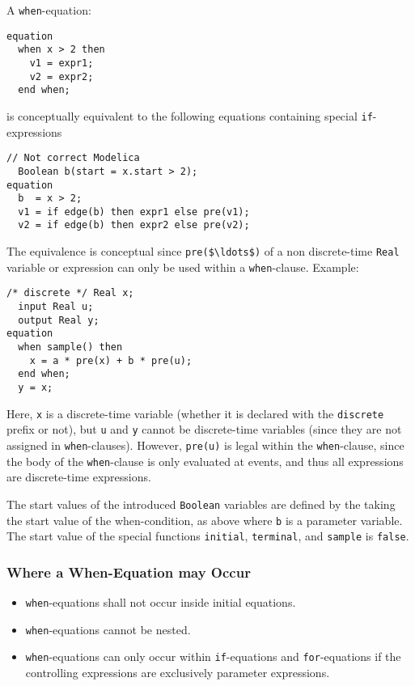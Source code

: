 A \lstinline!when!-equation:
\begin{lstlisting}[language=modelica]
equation
  when x > 2 then
    v1 = expr1;
    v2 = expr2;
  end when;
\end{lstlisting}
is conceptually equivalent to the following equations containing special \lstinline!if!-expressions
\begin{lstlisting}[language=modelica]
  // Not correct Modelica
  Boolean b(start = x.start > 2);
equation
  b  = x > 2;
  v1 = if edge(b) then expr1 else pre(v1);
  v2 = if edge(b) then expr2 else pre(v2);
\end{lstlisting}

\begin{nonnormative}
The equivalence is conceptual since \lstinline!pre($\ldots$)! of a non discrete-time \lstinline!Real! variable or expression can only be used within a \lstinline!when!-clause.
Example:
\begin{lstlisting}[language=modelica]
  /* discrete */ Real x;
  input Real u;
  output Real y;
equation
  when sample() then
    x = a * pre(x) + b * pre(u);
  end when;
  y = x;
\end{lstlisting}

Here, \lstinline!x! is a discrete-time variable (whether it is declared with the \lstinline!discrete! prefix or not), but \lstinline!u! and \lstinline!y! cannot be discrete-time variables
(since they are not assigned in \lstinline!when!-clauses).
However, \lstinline!pre(u)! is legal within the \lstinline!when!-clause, since the body of the \lstinline!when!-clause is only evaluated at events, and thus all expressions are discrete-time expressions.
\end{nonnormative}

The start values of the introduced \lstinline!Boolean! variables are defined by the taking the start value of the when-condition, as above where \lstinline!b! is a parameter variable.
The start value of the special functions \lstinline!initial!, \lstinline!terminal!, and \lstinline!sample! is \lstinline!false!.

\subsubsection{Where a When-Equation may Occur}\label{restrictions-on-where-a-when-equation-may-occur}\label{where-a-when-equation-may-occur}

\begin{itemize}
\item
  \lstinline!when!-equations shall not occur inside initial equations.
\item
  \lstinline!when!-equations cannot be nested.
\item
  \lstinline!when!-equations can only occur within \lstinline!if!-equations and \lstinline!for!-equations if the controlling expressions are exclusively parameter expressions.
\end{itemize}

